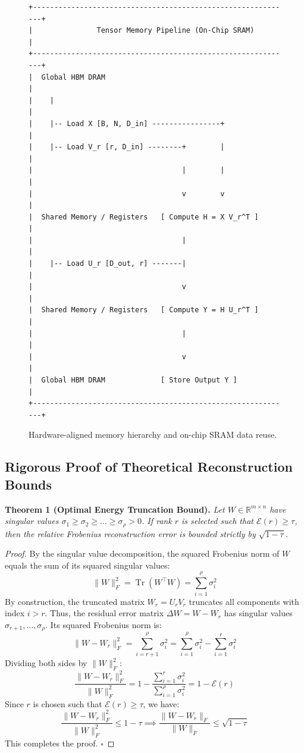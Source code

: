 \begin{figure}[H]
\centering
\begin{verbatim}
+-------------------------------------------------------------+
|               Tensor Memory Pipeline (On-Chip SRAM)         |
+-------------------------------------------------------------+
|  Global HBM DRAM                                            |
|    |                                                        |
|    |-- Load X [B, N, D_in] ----------------+                |
|    |-- Load V_r [r, D_in] --------+        |                |
|                                   |        |                |
|                                   v        v                |
|  Shared Memory / Registers   [ Compute H = X V_r^T ]        |
|                                   |                         |
|    |-- Load U_r [D_out, r] -------|                         |
|                                   v                         |
|  Shared Memory / Registers   [ Compute Y = H U_r^T ]        |
|                                   |                         |
|                                   v                         |
|  Global HBM DRAM             [ Store Output Y ]             |
+-------------------------------------------------------------+
\end{verbatim}
\caption{Hardware-aligned memory hierarchy and on-chip SRAM data reuse.}
\label{fig:memory_hierarchy}
\end{figure}

\subsection{Rigorous Proof of Theoretical Reconstruction Bounds}

\textbf{Theorem 1 (Optimal Energy Truncation Bound).} \textit{Let $W \in \mathbb{R}^{m \times n}$ have singular values $\sigma_1 \ge \sigma_2 \ge \dots \ge \sigma_{\rho} > 0$. If rank $r$ is selected such that $\mathcal{E}(r) \ge \tau$, then the relative Frobenius reconstruction error is bounded strictly by $\sqrt{1 - \tau}$.}

\begin{proof}
By the singular value decomposition, the squared Frobenius norm of $W$ equals the sum of its squared singular values:
\[
\|W\|_F^2 = \operatorname{Tr}(W^\top W) = \sum_{i=1}^{\rho} \sigma_i^2
\]
By construction, the truncated matrix $W_r = U_r V_r$ truncates all components with index $i > r$. Thus, the residual error matrix $\Delta W = W - W_r$ has singular values $\sigma_{r+1}, \dots, \sigma_{\rho}$.
Its squared Frobenius norm is:
\[
\|W - W_r\|_F^2 = \sum_{i=r+1}^{\rho} \sigma_i^2 = \sum_{i=1}^{\rho} \sigma_i^2 - \sum_{i=1}^{r} \sigma_i^2
\]
Dividing both sides by $\|W\|_F^2$:
\[
\frac{\|W - W_r\|_F^2}{\|W\|_F^2} = 1 - \frac{\sum_{i=1}^{r} \sigma_i^2}{\sum_{i=1}^{\rho} \sigma_i^2} = 1 - \mathcal{E}(r)
\]
Since $r$ is chosen such that $\mathcal{E}(r) \ge \tau$, we have:
\[
\frac{\|W - W_r\|_F^2}{\|W\|_F^2} \le 1 - \tau \implies \frac{\|W - W_r\|_F}{\|W\|_F} \le \sqrt{1 - \tau}
\]
This completes the proof. $\square$
\end{proof}

